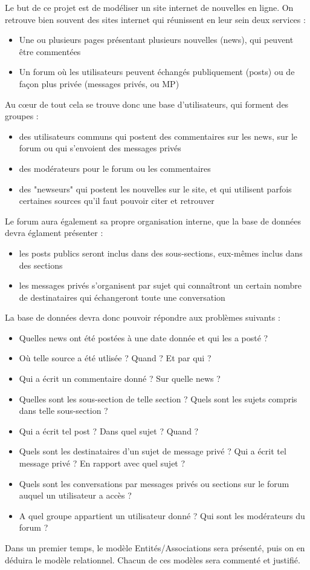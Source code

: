 Le but de ce projet est de modéliser un site internet de nouvelles en ligne. On retrouve bien souvent des sites internet qui réunissent en leur sein deux services :
\begin{itemize}
	\item Une ou plusieurs pages présentant plusieurs nouvelles (news), qui peuvent être commentées
	\item Un forum où les utilisateurs peuvent échangés publiquement (posts) ou de façon plus privée (messages privés, ou MP)
\end{itemize}

\smallskip
Au c\oe ur de tout cela se trouve donc une base d'utilisateurs, qui forment des groupes :
\begin{itemize}
	\item des utilisateurs communs qui postent des commentaires sur les news, sur le forum ou qui s'envoient des messages privés
	\item des modérateurs pour le forum ou les commentaires
	\item des "newseurs" qui postent les nouvelles sur le site, et qui utilisent parfois certaines sources qu'il faut pouvoir citer et retrouver
\end{itemize}

\smallskip
Le forum aura également sa propre organisation interne, que la base de données devra églament présenter :
\begin{itemize}
	\item les posts publics seront inclus dans des sous-sections, eux-mêmes inclus dans des sections
	\item les messages privés s'organisent par sujet qui connaîtront un certain nombre de destinataires qui échangeront toute une conversation
\end{itemize}

\bigskip
La base de données devra donc pouvoir répondre aux problèmes suivants :
\begin{itemize}
	\item Quelles news ont été postées à une date donnée et qui les a posté ?
	\item Où telle source a été utlisée ? Quand ? Et par qui ?
	\item Qui a écrit un commentaire donné ? Sur quelle news ?
	\item Quelles sont les sous-section de telle section ? Quels sont les sujets compris dans telle sous-section ?
	\item Qui a écrit tel post ? Dans quel sujet ? Quand ?
	\item Quels sont les destinataires d'un sujet de message privé ? Qui a écrit tel message privé ? En rapport avec quel sujet ?
	\item Quels sont les conversations par messages privés ou sections sur le forum auquel un utilisateur a accès ?
	\item A quel groupe appartient un utilisateur donné ? Qui sont les modérateurs du forum ? 
\end{itemize}

\bigskip
Dans un premier temps, le modèle Entités/Associations sera présenté, puis on en déduira le modèle relationnel. Chacun de ces modèles sera commenté et justifié.

